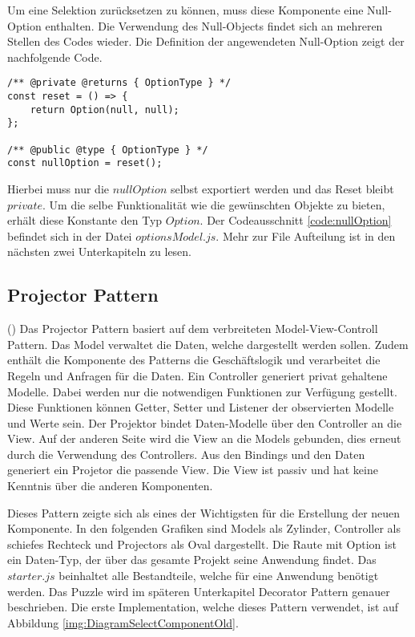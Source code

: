 Um eine Selektion zurücksetzen zu können, muss diese Komponente eine Null-Option enthalten.
Die Verwendung des Null-Objects findet sich an mehreren Stellen des Codes wieder.
Die Definition der angewendeten Null-Option zeigt der nachfolgende Code.

\begin{lstlisting}[style = htmlcssjs, caption = Null-Option, label = code:nullOption]
/** @private @returns { OptionType } */
const reset = () => {
    return Option(null, null);
};

/** @public @type { OptionType } */
const nullOption = reset();
\end{lstlisting}

Hierbei muss nur die $nullOption$ selbst exportiert werden und das Reset bleibt $private$.
Um die selbe Funktionalität wie die gewünschten Objekte zu bieten, erhält diese Konstante den Typ $Option$.
Der Codeausschnitt \ref{code:nullOption} befindet sich in der Datei $optionsModel.js$.
Mehr zur File Aufteilung ist in den nächsten zwei Unterkapiteln zu lesen.

\subsection{Projector Pattern}
\label{sec:projectorPattern}

(\cite{projectorPattern}) Das Projector Pattern basiert auf dem verbreiteten Model-View-Controll Pattern.
Das Model verwaltet die Daten, welche dargestellt werden sollen.
Zudem enthält die Komponente des Patterns die Geschäftslogik und verarbeitet die Regeln und Anfragen für die Daten.
Ein Controller generiert privat gehaltene Modelle.
Dabei werden nur die notwendigen Funktionen zur Verfügung gestellt.
Diese Funktionen können Getter, Setter und Listener der observierten Modelle und Werte sein.
Der Projektor bindet Daten-Modelle über den Controller an die View.
Auf der anderen Seite wird die View an die Models gebunden, dies erneut durch die Verwendung des Controllers.
Aus den Bindings und den Daten generiert ein Projetor die passende View.
Die View ist passiv und hat keine Kenntnis über die anderen Komponenten.

Dieses Pattern zeigte sich als eines der Wichtigsten für die Erstellung der neuen Komponente.
In den folgenden Grafiken sind Models als Zylinder, Controller als schiefes Rechteck und Projectors als Oval dargestellt.
Die Raute mit Option ist ein Daten-Typ, der über das gesamte Projekt seine Anwendung findet.
Das $starter.js$ beinhaltet alle Bestandteile, welche für eine Anwendung benötigt werden.
Das Puzzle wird im späteren Unterkapitel Decorator Pattern genauer beschrieben.
Die erste Implementation, welche dieses Pattern verwendet, ist auf Abbildung \ref{img:DiagramSelectComponentOld}.

